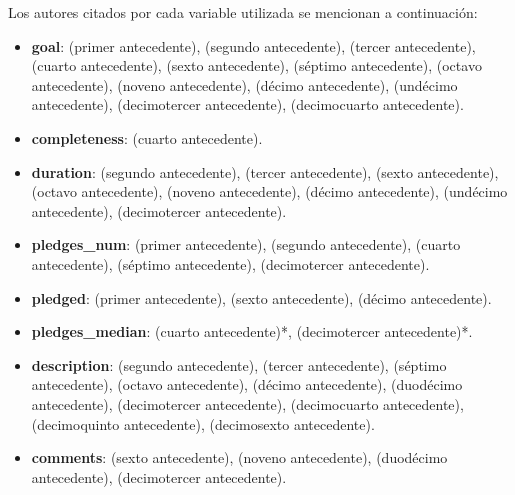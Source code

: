 Los autores citados por cada variable utilizada se mencionan a continuación:
\begin{itemize}
	\item \textbf{goal}: \cite{pr_chen2013kickpredict} (primer antecedente), \cite{pr_mitra2014phrases} (segundo antecedente), \cite{pr_zhou2015projectdesc} (tercer antecedente), \cite{pr_chen2015predcrowd} (cuarto antecedente), \cite{pr_li2016predcrowd} (sexto antecedente), \cite{pr_yuan2016textanalytics} (séptimo antecedente), \cite{pr_sawhney2016usingLT} (octavo antecedente), \cite{pr_kaur2017socmedcrowd} (noveno antecedente), \cite{pr_kamath2018suplearn} (décimo antecedente), \cite{pr_yu2018deeplearning} (undécimo antecedente), \cite{pr_jin2019dayssuccess} (decimotercer antecedente), \cite{pr_cheng2019deeplearning} (decimocuarto antecedente).
	\item \textbf{completeness}: \cite{pr_chen2015predcrowd} (cuarto antecedente).
	\item \textbf{duration}: \cite{pr_mitra2014phrases} (segundo antecedente), \cite{pr_zhou2015projectdesc} (tercer antecedente), \cite{pr_li2016predcrowd} (sexto antecedente), \cite{pr_sawhney2016usingLT} (octavo antecedente), \cite{pr_kaur2017socmedcrowd} (noveno antecedente), \cite{pr_kamath2018suplearn} (décimo antecedente), \cite{pr_yu2018deeplearning} (undécimo antecedente), \cite{pr_jin2019dayssuccess} (decimotercer antecedente).
	\item \textbf{pledges\_num}: \cite{pr_chen2013kickpredict} (primer antecedente), \cite{pr_mitra2014phrases} (segundo antecedente), \cite{pr_chen2015predcrowd} (cuarto antecedente), \cite{pr_yuan2016textanalytics} (séptimo antecedente), \cite{pr_jin2019dayssuccess} (decimotercer antecedente).
	\item \textbf{pledged}: \cite{pr_chen2013kickpredict} (primer antecedente), \cite{pr_li2016predcrowd} (sexto antecedente), \cite{pr_kamath2018suplearn} (décimo antecedente).
	\item \textbf{pledges\_median}: \cite{pr_chen2015predcrowd} (cuarto antecedente)*, \cite{pr_jin2019dayssuccess} (decimotercer antecedente)*.
	\item \textbf{description}: \cite{pr_mitra2014phrases} (segundo antecedente), \cite{pr_zhou2015projectdesc} (tercer antecedente), \cite{pr_yuan2016textanalytics} (séptimo antecedente), \cite{pr_sawhney2016usingLT} (octavo antecedente), \cite{pr_kamath2018suplearn} (décimo antecedente), \cite{pr_lee2018contentDL} (duodécimo antecedente), \cite{pr_jin2019dayssuccess} (decimotercer antecedente), \cite{pr_cheng2019deeplearning} (decimocuarto antecedente), \cite{pr_chen2019keywords_crowdfunding} (decimoquinto antecedente), \cite{pr_chaichi2019nlp_3dprinting} (decimosexto antecedente).
	\item \textbf{comments}: \cite{pr_li2016predcrowd} (sexto antecedente), \cite{pr_kaur2017socmedcrowd} (noveno antecedente), \cite{pr_lee2018contentDL} (duodécimo antecedente), \cite{pr_jin2019dayssuccess} (decimotercer antecedente).
\end{itemize}

